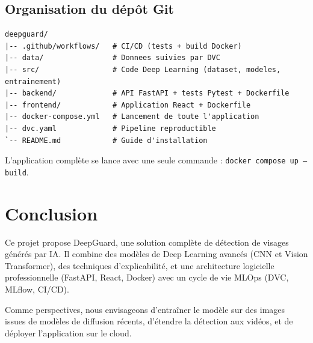 \documentclass[11pt,a4paper]{article}
\newcommand{\nomprojet}{DeepGuard}
\begin{document}
\subsection{Organisation du dépôt Git}

\begin{lstlisting}
deepguard/
|-- .github/workflows/   # CI/CD (tests + build Docker)
|-- data/                # Donnees suivies par DVC
|-- src/                 # Code Deep Learning (dataset, modeles, entrainement)
|-- backend/             # API FastAPI + tests Pytest + Dockerfile
|-- frontend/            # Application React + Dockerfile
|-- docker-compose.yml   # Lancement de toute l'application
|-- dvc.yaml             # Pipeline reproductible
`-- README.md            # Guide d'installation
\end{lstlisting}

L'application complète se lance avec une seule commande :
\texttt{docker compose up --build}.

\section{Conclusion}

Ce projet propose \nomprojet, une solution complète de détection de visages générés par IA. Il
combine des modèles de Deep Learning avancés (CNN et Vision Transformer), des techniques
d'explicabilité, et une architecture logicielle professionnelle (FastAPI, React, Docker) avec un
cycle de vie MLOps (DVC, MLflow, CI/CD).

Comme perspectives, nous envisageons d'entraîner le modèle sur des images issues de modèles de
diffusion récents, d'étendre la détection aux vidéos, et de déployer l'application sur le cloud.
\end{document}
